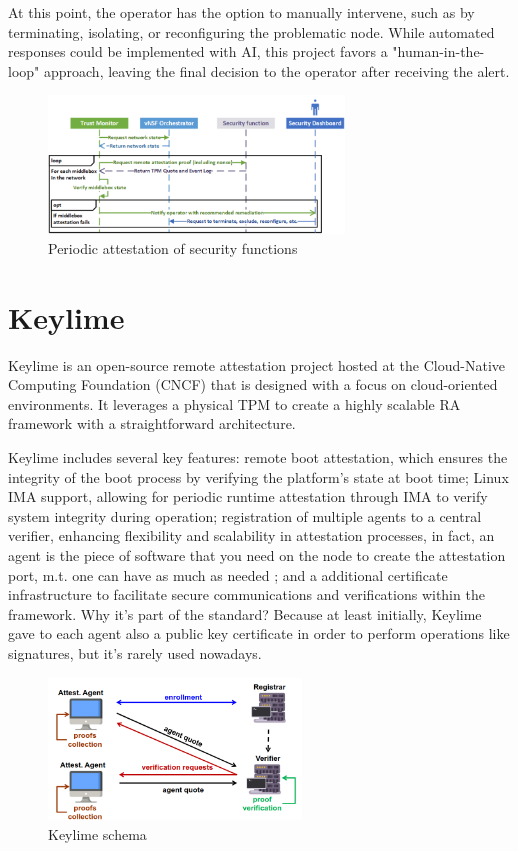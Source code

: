 At this point, the operator has the option to manually intervene, such
as by terminating, isolating, or reconfiguring the problematic node.
While automated responses could be implemented with AI, this project
favors a "human-in-the-loop" approach, leaving the final decision to
the operator after receiving the alert.

\begin{figure}[H]
  \centering
  \includegraphics[width=0.7\textwidth]{img/shield periodic attestation.png}
  \caption{Periodic attestation of security functions}
\end{figure}

\section{Keylime}

Keylime is an open-source remote attestation project hosted at the
Cloud-Native Computing Foundation (CNCF) that is designed with a focus
on cloud-oriented environments. It leverages a physical TPM to create
a highly scalable RA framework with a straightforward architecture.

Keylime includes several key features: remote boot attestation, which
ensures the integrity of the boot process by verifying the platform's
state at boot time; Linux IMA support, allowing for periodic runtime
attestation through IMA to verify system integrity during operation;
registration of multiple agents to a central verifier, enhancing
flexibility and scalability in attestation processes, in fact, an
agent is the piece of software that you need on the node to create the
attestation port, m.t. one can have as much as needed ; and a
additional certificate infrastructure to facilitate secure
communications and verifications within the framework. Why it's part
of the standard? Because at least initially, Keylime gave to each
agent also a public key certificate in order to perform operations
like signatures, but it's rarely used nowadays.

\begin{figure}[H]
  \centering
  \includegraphics[width=0.6\textwidth]{img/keylime schema.png}
  \caption{Keylime schema}
\end{figure}


